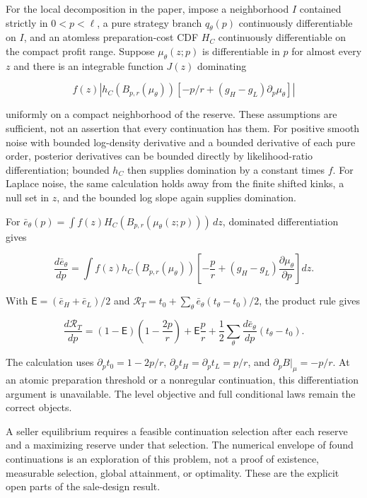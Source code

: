 \documentclass[
  11pt,
]{article}
\begin{document}
For the local decomposition in the paper, impose a neighborhood \(I\)
contained strictly in \(0<p<\ell\), a pure strategy branch
\(q_\theta(p)\) continuously differentiable on \(I\), and an atomless
preparation-cost CDF \(H_C\) continuously differentiable on the compact
profit range. Suppose \(\mu_\theta(z;p)\) is differentiable in \(p\) for
almost every \(z\) and there is an integrable function \(J(z)\)
dominating

\[
f(z)\left|h_C(B_{p,r}(\mu_\theta))\left[-p/r+(g_H-g_L)\partial_p\mu_\theta\right]\right|
\tag{OA.54}\label{eq:oa-oa-54}
\]

uniformly on a compact neighborhood of the reserve. These assumptions
are sufficient, not an assertion that every continuation has them. For
positive smooth noise with bounded log-density derivative and a bounded
derivative of each pure order, posterior derivatives can be bounded
directly by likelihood-ratio differentiation; bounded \(h_C\) then
supplies domination by a constant times \(f\). For Laplace noise, the
same calculation holds away from the finite shifted kinks, a null set in
\(z\), and the bounded log slope again supplies domination.

For \(\bar e_\theta(p)=\int f(z)H_C(B_{p,r}(\mu_\theta(z;p)))\,dz\),
dominated differentiation gives

\[
\frac{d\bar e_\theta}{dp}
=\int f(z)h_C(B_{p,r}(\mu_\theta))
\left[-\frac p r+(g_H-g_L)\frac{\partial\mu_\theta}{\partial p}\right]dz.
\tag{OA.55}\label{eq:oa-oa-55}
\]

With \(\mathsf E=(\bar e_H+\bar e_L)/2\) and
\(\mathcal R_T=t_0+\sum_\theta\bar e_\theta(t_\theta-t_0)/2\), the
product rule gives

\[
\frac{d\mathcal R_T}{dp}
=(1-\mathsf E)\left(1-\frac{2p}{r}\right)+\mathsf E\frac p r
+\frac12\sum_\theta\frac{d\bar e_\theta}{dp}(t_\theta-t_0).
\tag{OA.56}\label{eq:oa-oa-56}
\]

The calculation uses \(\partial_pt_0=1-2p/r\),
\(\partial_pt_H=\partial_pt_L=p/r\), and \(\partial_pB|_\mu=-p/r\). At
an atomic preparation threshold or a nonregular continuation, this
differentiation argument is unavailable. The level objective and full
conditional laws remain the correct objects.

A seller equilibrium requires a feasible continuation selection after
each reserve and a maximizing reserve under that selection. The
numerical envelope of found continuations is an exploration of this
problem, not a proof of existence, measurable selection, global
attainment, or optimality. These are the explicit open parts of the
sale-design result.
\end{document}
